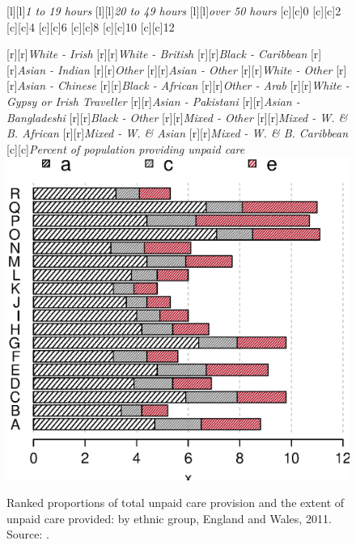\documentclass[11 pt, a4paper]{report}
\begin{document}
\begin{figure}[hbtp!]
[l][l]{\small{\emph{1 to 19 hours}}}
[l][l]{\small{\emph{20 to 49 hours}}}
[l][l]{\small{\emph{over 50 hours}}}
[c][c]{\small{0}}
[c][c]{\small{2}}
[c][c]{\small{4}}
[c][c]{\small{6}}
[c][c]{\small{8}}
[c][c]{\small{10}}
[c][c]{\small{12}}

[r][r]{\scriptsize{\emph{White - Irish}}}
[r][r]{\scriptsize{\emph{White - British}}}
[r][r]{\scriptsize{\emph{Black - Caribbean}}}
[r][r]{\scriptsize{\emph{Asian - Indian}}}
[r][r]{\scriptsize{\emph{Other}}}
[r][r]{\scriptsize{\emph{Asian - Other}}}
[r][r]{\scriptsize{\emph{White - Other}}}
[r][r]{\scriptsize{\emph{Asian - Chinese}}}
[r][r]{\scriptsize{\emph{Black - African}}}
[r][r]{\scriptsize{\emph{Other - Arab}}}
[r][r]{\scriptsize{\emph{White - Gypsy or Irish Traveller}}}
[r][r]{\scriptsize{\emph{Asian - Pakistani}}}
[r][r]{\scriptsize{\emph{Asian - Bangladeshi}}}
[r][r]{\scriptsize{\emph{Black - Other}}}
[r][r]{\scriptsize{\emph{Mixed - Other}}}
[r][r]{\scriptsize{\emph{Mixed - W. \& B. African}}}
[r][r]{\scriptsize{\emph{Mixed - W. \& Asian}}}
[r][r]{\scriptsize{\emph{Mixed - W. \& B. Caribbean}}}
[c][c]{\small{\emph{Percent of population providing unpaid care}}}
\includegraphics[width=\textwidth]{../figures/Fig8.9.eps}
\caption{Ranked proportions of total unpaid care provision and the extent of unpaid care
provided: by ethnic group, England and Wales, 2011. Source: \citet{ONS2013}.
}\label{Fig:N12} %
\end{figure}
\end{document}

